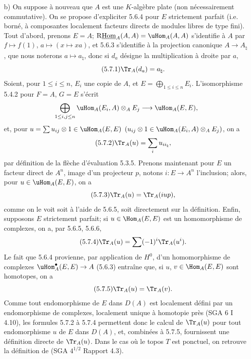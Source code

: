 b) On suppose à nouveau que $A$ est une $K$-algèbre plate (non nécessairement commutative). On se propose d'expliciter 5.6.4 pour $E$ strictement parfait (i.e. borné, à composantes localement facteurs directs de modules libres de type fini). Tout d'abord, prenons $E=A$; $\mathrm{R}\underline{\mathrm{Hom}}_A(A,A)=\uHom_A(A,A)$ s'identifie à $A$ par $f\mapsto f(1)$, $a\mapsto(x\mapsto xa)$, et 5.6.3 s'identifie à la projection canonique $A\to A_\natural$, que nous noterons $a\mapsto a_\natural$, donc si $d_a$ désigne la multiplication à droite par $a$,
\begin{equation}\tag{5.7.1}
\Tr_A(d_a)=a_\natural.
\end{equation}
Soient, pour $1\le i\le n$, $E_i$ une copie de $A$, et $E=\bigoplus_{1\le i\le n}E_i$. L'isomorphisme 5.4.2 pour $F=A$, $G=E$ s'écrit
\[
\bigoplus_{1\le i,j\le n}\uHom_A(E_i,A)\otimes_AE_j\longrightarrow\uHom_A(E,E),
\]
et, pour $u=\sum u_{ij}\otimes 1\in\uHom_A(E,E)$ $(u_{ij}\otimes 1\in\uHom_A(E_i,A)\otimes_A E_j)$, on a
\begin{equation}\tag{5.7.2}
\Tr_A(u)=\sum_i u_{ii_\natural},
\end{equation}
par définition de la flèche d'évaluation 5.3.5. Prenons maintenant pour $E$ un facteur direct de $A^n$, image d'un projecteur $p$, notons $i:E\to A^n$ l'inclusion; alors, pour $u\in\uHom_A(E,E)$, on a
\begin{equation}\tag{5.7.3}
\Tr_A(u)=\Tr_A(iup),
\end{equation}
comme on le voit soit à l'aide de 5.6.5, soit directement sur la définition. Enfin, supposons $E$ strictement parfait; si $u\in\Hom_A(E,E)$ est un homomorphisme de complexes, on a, par 5.6.5, 5.6.6,
\begin{equation}\tag{5.7.4}
\Tr_A(u)=\sum(-1)^i\Tr_A(u^i).
\end{equation}
Le
fait que 5.6.4 provienne, par application de $H^0$, d'un homomorphisme de complexes $\uHom_A^\bullet(E,E)\to A$ (5.6.3) entraîne que, si $u$, $v\in\Hom_A(E,E)$ sont homotopes, on a
\begin{equation}\tag{5.7.5}
\Tr_A(u)=\Tr_A(v).
\end{equation}
Comme tout endomorphisme de $E$ dans $D(A)$ est localement défini par un endomorphisme de complexes, localement unique à homotopie près (SGA 6 I 4.10), les formules 5.7.2 à 5.7.4 permettent donc le calcul de $\Tr_A(u)$ pour tout endomorphisme $u$ de $E$ dans $D(A)$, et, combinées à 5.7.5, fournissent une définition directe de $\Tr_A(u)$. Dans le cas où le topos $T$ est ponctuel, on retrouve la définition de (SGA $4^{1/2}$ Rapport 4.3).

